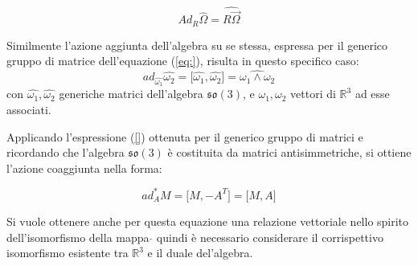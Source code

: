 \documentclass[11pt]{report}
\theoremstyle{plain}
\theoremstyle{definition}
\theoremstyle{remark}
\begin{document}
\begin{equation}
Ad_{R}\widehat{\Omega} = \widehat{R \vec{\Omega}}
\end{equation}

Similmente l'azione aggiunta dell'algebra su se stessa, espressa per il generico gruppo di matrice dell'equazione (\ref{eq:}), risulta in questo specifico caso:
\begin{equation}
ad_{\widehat{\omega_{1}}} \widehat{\omega_{2}} = \bigr[ \widehat{\omega_{1}},\widehat{\omega_{2}} \bigr] = \widehat{\omega_{1} \wedge \omega_{2}}
\end{equation}
con $\widehat{\omega_{1}},\widehat{\omega_{2}}$ generiche matrici dell'algebra $\mathfrak{so(3)}$, e $\omega_{1},\omega_{2}$ vettori di $\mathbb{R}^{3}$ ad esse associati.

Applicando l'espressione (\ref{})  ottenuta per il generico gruppo di matrici e ricordando che l'algebra $\mathfrak{so(3)}$ è costituita da matrici antisimmetriche, si ottiene l'azione coaggiunta nella forma:

\begin{displaymath}
ad_{A}^{\ast} M = \bigr[M, -A^{T}\bigr] = \bigr[M, A\bigr]
\end{displaymath}

Si vuole ottenere anche per questa equazione una relazione vettoriale nello spirito dell'isomorfismo della mappa $\widehat{ }$ quindi è necessario considerare il corrispettivo isomorfismo esistente tra $\mathbb{R}^{3}$ e il duale del'algebra.
\end{document}
